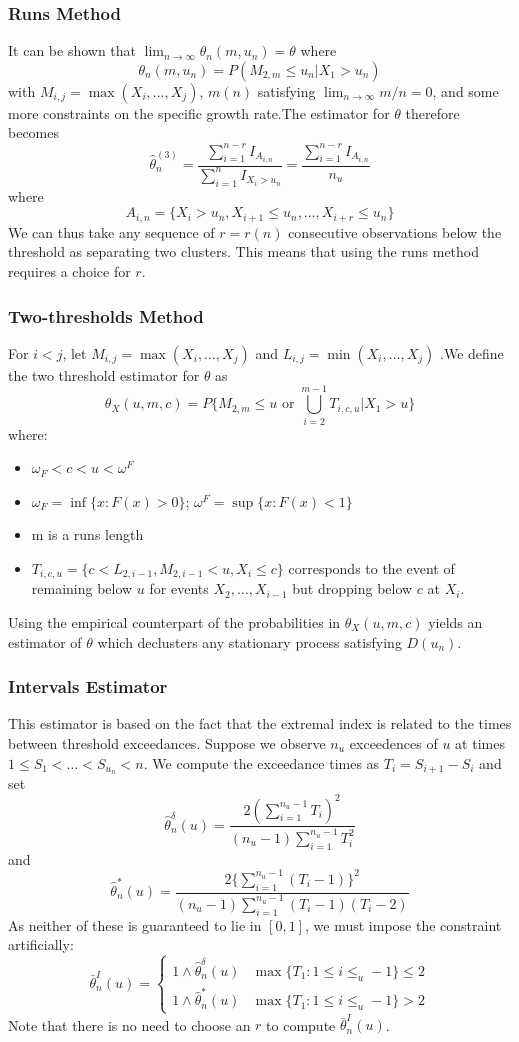 \documentclass{article}
\theoremstyle{definition}
\theoremstyle{definition}
\begin{document}
\subsubsection{Runs Method}
It can be shown that $\lim_{n\rightarrow \infty}\theta_n(m, u_n)= \theta$ where 
\[\theta_n(m, u_n)=P(M_{2,m}\leq u_n|X_1>u_n)\]
with $M_{i,j}= \max(X_i,\hdots, X_j)$, $m(n)$ satisfying $\lim_{n\rightarrow \infty} m/n=0$, and some more constraints on the specific growth rate.The estimator for $\theta$ therefore becomes
\[\hat{\theta}_n^{(3)}= \frac{\sum_{i=1}^{n-r}I_{A_{i,n}}}{\sum_{i=1}^n I_{X_i>u_n}}=\frac{\sum_{i=1}^{n-r}I_{A_{i,n}}}{n_u}\]
where 
\[A_{i,n}= \{X_i>u_n, X_{i+1}\leq u_n, \hdots, X_{i+r}\leq u_n\}\]
We can thus take any sequence of $r = r(n)$ consecutive observations below the threshold as separating two clusters. This means that using the runs method requires a choice for $r$.
\subsubsection{Two-thresholds Method}
For $i<j$, let $M_{i,j}=\max(X_i, \hdots, X_j)$ and $L_{i,j}=\min(X_i, \hdots, X_j)$ .We define the two threshold estimator for $\theta$ as 
\[\theta_X(u, m, c) = P \bigg\{ M_{2,m}\leq u \text{ or }\bigcup_{i=2}^{m-1} T_{i,c,u}|X_1>u \bigg\}\]
where:
\begin{itemize}
    \item $\omega_F<c<u<\omega^F$
    \item $\omega_F= \inf\{x:F(x)>0\}$; $\omega^F= \sup\{x:F(x)<1\}$
    \item m is a runs length
    \item $T_{i,c,u}= \{c<L_{2,i-1},M_{2,i-1}<u, X_i\leq c\}$ corresponds to the event of remaining below $u$ for events $X_2, \hdots, X_{i-1}$ but dropping below $c$ at $X_i$.
\end{itemize}
Using the empirical counterpart of the probabilities in $\theta_X(u, m, c)$ yields an estimator of $\theta$ which
declusters any stationary process satisfying $D(u_n)$.

\subsubsection{Intervals Estimator}
This estimator is based on the fact
that the extremal index is related to the
times between threshold exceedances. Suppose we observe $n_u$ exceedences of $u$ at times $1\leq S_1< \hdots < S_{u_n}<n$. We compute the exceedance times as $T_i= S_{i+1}-S_{i}$ and set 
\[\hat{\theta}^\delta_n(u)=\frac{2(\sum_{i=1}^{n_u-1}T_i)^2}{(n_u-1)\sum_{i=1}^{n_u-1}T_i^2}\]
and 
\[\hat{\theta}^*_n(u)=\frac{2\{\sum_{i=1}^{n_u-1}(T_i-1)\}^2}{(n_u-1)\sum_{i=1}^{n_u-1}(T_i-1)(T_i-2)}\]
As neither of these is guaranteed to lie in $[0,1]$, we must impose the constraint artificially:
\[\bar{\theta}_n^I(u)=\begin{cases}
1 \wedge \hat{\theta}^\delta_n(u)& \max\{T_1:1\leq i\leq_u-1\}\leq 2 \\
1 \wedge \hat{\theta}^*_n(u)&\max\{T_1:1\leq i\leq_u-1\}> 2 
\end{cases}\]
Note that there is no need to choose an $r$ to compute $\bar{\theta}_n^I(u)$.
\end{document}
